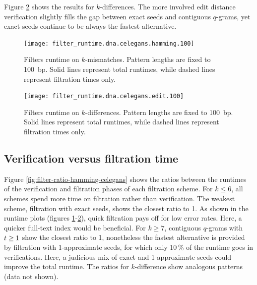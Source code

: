 Figure \ref{fig:filter-runtime-edit-celegans} shows the results for $k$-differences.
The more involved edit distance verification slightly fills the gap between exact seeds and contiguous $q$-grams, yet exact seeds continue to be always the fastest alternative.

\begin{figure}[t]
\begin{center}
\caption[Filters runtime on $k$-mismatches]{Filters runtime on $k$-mismatches. Pattern lengths are fixed to 100~bp. Solid lines represent total runtimes, while dashed lines represent filtration times only.}
\label{fig:filter-runtime-hamming-celegans}
\texttt{[image: filter\_runtime.dna.celegans.hamming.100]}
\end{center}
\end{figure}

\begin{figure}[b]
\begin{center}
\caption[Filters runtime on $k$-differences]{Filters runtime on $k$-differences. Pattern lengths are fixed to 100~bp. Solid lines represent total runtimes, while dashed lines represent filtration times only.}
\label{fig:filter-runtime-edit-celegans}
\texttt{[image: filter\_runtime.dna.celegans.edit.100]}
\end{center}
\end{figure}

\subsection{Verification versus filtration time}

Figure \ref{fig:filter-ratio-hamming-celegans} shows the ratios between the runtimes of the verification and filtration phases of each filtration scheme.
For $k \leq 6$, all schemes spend more time on filtration rather than verification.
The weakest scheme, filtration with exact seeds, shows the closest ratio to 1.
As shown in the runtime plots (figures \ref{fig:filter-runtime-hamming-celegans}-\ref{fig:filter-runtime-edit-celegans}), quick filtration pays off for low error rates.
Here, a quicker full-text index would be beneficial.
For $k \geq 7$, contiguous $q$-grams with $t \geq 1$ show the closest ratio to 1, nonetheless the fastest alternative is provided by filtration with 1-approximate seeds, for which only 10\,\% of the runtime goes in verifications.
Here, a judicious mix of exact and 1-approximate seeds could improve the total runtime.
The ratios for $k$-difference show analogous patterns (data not shown).

